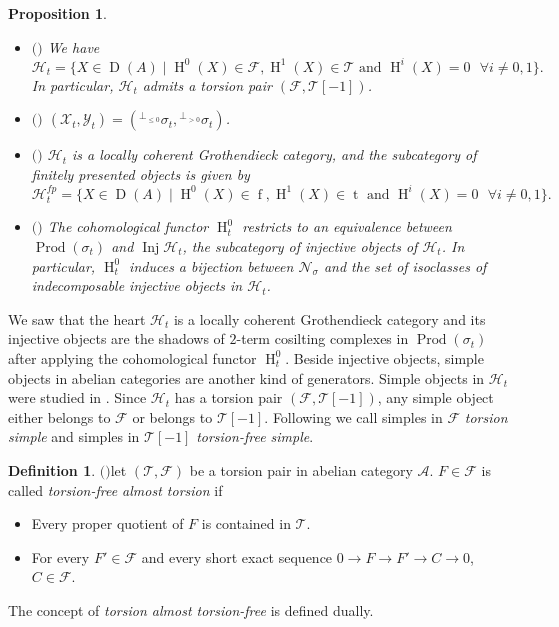 \documentclass[12pt]{amsart}
\numberwithin{equation}{section}
\newtheorem{proposition}[lemma]{Proposition}
\theoremstyle{definition}
\newtheorem{definition}[lemma]{Definition}
\DeclareMathOperator{\Inj}{Inj}
\DeclareMathOperator{\D}{D}
\DeclareMathOperator{\ts}{t}
\DeclareMathOperator{\fs}{f}
\DeclareMathOperator{\HH}{H}
\DeclareMathOperator{\Prod}{Prod}
\newtheorem*{theorem 0*}{Theorem}
\newtheorem*{theorem a*}{Theorem A}
\newtheorem*{theorem b*}{Theorem B}
\numberwithin{diagram}{section}
\begin{document}
\begin{proposition}\label{2.19}
\begin{itemize}
\item[(1)]$($\cite{HRS}$)$
We have
\[\mathcal{H}_t=\{X\in \D(A)\mid \HH^0(X)\in\mathcal{F}, \HH^1(X)\in\mathcal{T}\text{ and } \HH^i(X)=0\text{ }\forall i\neq 0,1\}.\]
In particular, $\mathcal{H}_t$ admits a torsion pair $(\mathcal{F},\mathcal{T}[-1])$.
\item[(2)]$($\cite[Theorem 1.3]{ZW}$)$
$(\mathcal{X}_t,\mathcal{Y}_t)=({}^{\bot_{\leq 0}}\sigma_t,{}^{\bot_{> 0}}\sigma_t)$.
\item[(3)]$($\cite[Theorem 5.2]{Sa}$)$
$\mathcal{H}_t$ is a locally coherent Grothendieck category, and the subcategory of finitely presented objects is given by
\[\mathcal{H}_t^{fp}=\{X\in \D(A)\mid \HH^0(X)\in\fs, \HH^1(X)\in\ts\text{ and } \HH^i(X)=0\text{ }\forall i\neq 0,1\}.\]
\item[(4)]$($\cite[Lemma 2.8]{AMV2}$)$
The cohomological functor $\HH^0_t$ restricts to an equivalence between $\Prod(\sigma_t)$ and $\Inj \mathcal{H}_t$, the subcategory of injective objects of $\mathcal{H}_t$. In particular, $\HH^0_t$ induces a bijection between $\mathcal{N}_{\sigma}$ and the set of isoclasses of indecomposable injective objects in $\mathcal{H}_t$.
\end{itemize}
\end{proposition}
	
	We saw that the heart $\mathcal{H}_t$ is a locally coherent Grothendieck category and its injective objects are the shadows of $2$-term cosilting complexes in $\Prod(\sigma_t)$ after applying the cohomological functor $\HH^0_t$. Beside injective objects, simple objects in abelian categories are another kind of generators.
	Simple objects in $\mathcal{H}_t$ were studied in \cite{AHL}.
	Since $\mathcal{H}_t$ has a torsion pair $(\mathcal{F},\mathcal{T}[-1])$, any simple object either belongs to $\mathcal{F}$ or belongs to $\mathcal{T}[-1]$. Following \cite{AHL} we call simples in $\mathcal{F}$ {\it torsion simple} and simples in $\mathcal{T}[-1]$ {\it torsion-free simple}.
    
\begin{definition}$($\cite[Definition 3.1]{AHL}$)$\label{2.20}
let $(\mathcal{T},\mathcal{F})$ be a torsion pair in abelian category $\mathcal{A}$. $F\in \mathcal{F}$ is called {\it torsion-free almost torsion} if
\begin{itemize}
	\item[(1)] Every proper quotient of $F$ is contained in $\mathcal{T}$.
	\item[(2)] For every $F'\in \mathcal{F}$ and every short exact sequence $0\rightarrow F\rightarrow F'\rightarrow C\rightarrow 0$, $C\in \mathcal{F}$.
\end{itemize}
The concept of {\it torsion almost torsion-free} is defined dually.
	\end{definition}
	
\end{document}
